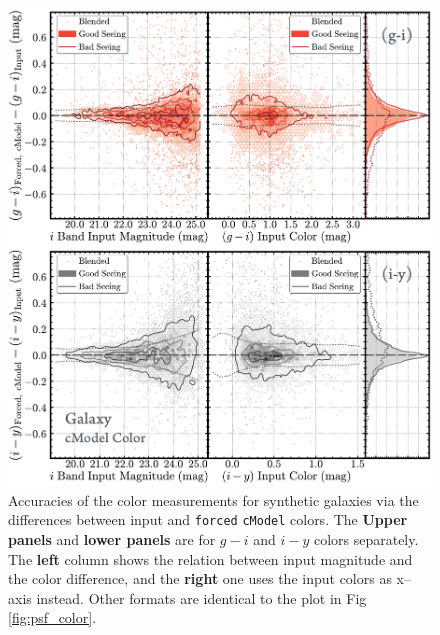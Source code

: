 \documentclass[useamsfonts]{pasj01}
\def\cmodel{\texttt{cModel}}
\def\forced{\texttt{forced}}
\begin{document}
\begin{figure}
    \begin{center}
        \includegraphics[width=\textwidth]{fig/synpipe_galaxy_color}
    \end{center}
    \caption{
        Accuracies of the color measurements for synthetic galaxies via the 
        differences between input and \forced{} \cmodel{} colors. 
        The \textbf{Upper panels} and \textbf{lower panels} are for $g-i$ and $i-y$ 
        colors separately.
        The \textbf{left} column shows the relation between input magnitude and 
        the color difference, and the \textbf{right} one uses the input colors as
        x--axis instead. 
        Other formats are identical to the plot in Fig \ref{fig:psf_color}.        
        }
    \label{fig:cmodel_color}
\end{figure}
\end{document}

